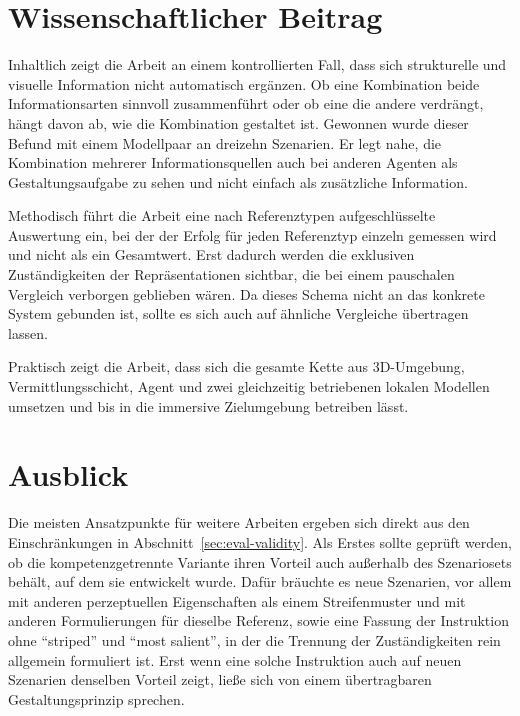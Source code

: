 \section[Beitrag]{Wissenschaftlicher Beitrag}
\label{sec:zus-beitrag}

Inhaltlich zeigt die Arbeit an einem kontrollierten Fall, dass sich strukturelle und visuelle Information nicht automatisch ergänzen.
Ob eine Kombination beide Informationsarten sinnvoll zusammenführt oder ob eine die andere verdrängt, hängt davon ab, wie die Kombination gestaltet ist.
Gewonnen wurde dieser Befund mit einem Modellpaar an dreizehn Szenarien.
Er legt nahe, die Kombination mehrerer Informationsquellen auch bei anderen Agenten als Gestaltungsaufgabe zu sehen und nicht einfach als zusätzliche Information.

Methodisch führt die Arbeit eine nach Referenztypen aufgeschlüsselte Auswertung ein, bei der der Erfolg für jeden Referenztyp einzeln gemessen wird und nicht als ein Gesamtwert.
Erst dadurch werden die exklusiven Zuständigkeiten der Repräsentationen sichtbar, die bei einem pauschalen Vergleich verborgen geblieben wären.
Da dieses Schema nicht an das konkrete System gebunden ist, sollte es sich auch auf ähnliche Vergleiche übertragen lassen.

Praktisch zeigt die Arbeit, dass sich die gesamte Kette aus 3D-Umgebung, Vermittlungsschicht, Agent und zwei gleichzeitig betriebenen lokalen Modellen umsetzen und bis in die immersive Zielumgebung betreiben lässt.


\section{Ausblick}
\label{sec:zus-ausblick}

Die meisten Ansatzpunkte für weitere Arbeiten ergeben sich direkt aus den Einschränkungen in Abschnitt~\ref{sec:eval-validity}.
Als Erstes sollte geprüft werden, ob die kompetenzgetrennte Variante ihren Vorteil auch außerhalb des Szenariosets behält, auf dem sie entwickelt wurde.
Dafür bräuchte es neue Szenarien, vor allem mit anderen perzeptuellen Eigenschaften als einem Streifenmuster und mit anderen Formulierungen für dieselbe Referenz, sowie eine Fassung der Instruktion ohne \enquote{striped} und \enquote{most salient}, in der die Trennung der Zuständigkeiten rein allgemein formuliert ist.
Erst wenn eine solche Instruktion auch auf neuen Szenarien denselben Vorteil zeigt, ließe sich von einem übertragbaren Gestaltungsprinzip sprechen.

